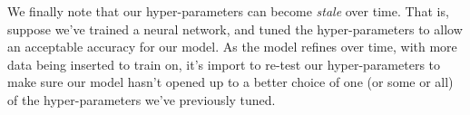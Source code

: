 We finally note that our hyper-parameters can become \textit{stale} over time.  That is, suppose we've trained a neural network, and tuned the hyper-parameters to allow an acceptable accuracy for our model.  As the model refines over time, with more data being inserted to train on, it's import to re-test our hyper-parameters to make sure our model hasn't opened up to a better choice of one (or some or all) of the hyper-parameters we've previously tuned.

